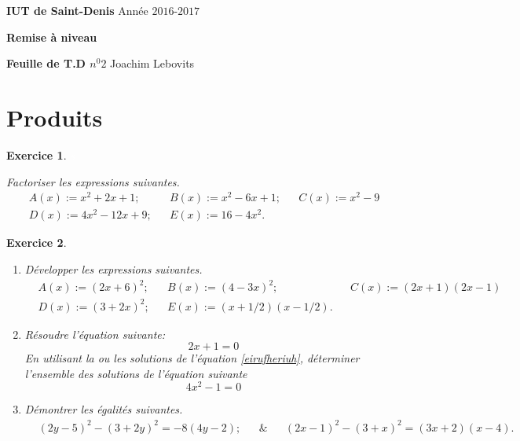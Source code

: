 \documentclass [10pt,a4paper] {article}
\newtheorem{exo}{Exercice}
\renewcommand\theequation{\thesection.\arabic{equation}}
\begin{document}
\setlength{\parindent}{0em}
\makeatletter
\renewcommand\theequation{\thesection.\arabic{equation}}
\makeatother


\begin{flushleft}
{ \bfseries IUT de Saint-Denis}			\hspace{9.25cm}				Année $2016$-$2017$

{ \bfseries Remise à niveau	}					

{ \bfseries Feuille de T.D $n^{0}2$}		 \hspace{9.5cm} Joachim Lebovits
\end{flushleft}




\date\today




\vspace{1cm}


\section{Produits}

\begin{exo}%

\textcolor{white}{s}

Factoriser les expressions suivantes.
\begin{align*}
 &A(x):= x^{2}+2x+1;&  &B(x):=x^{2}-6x+1;& 
 &C(x):=x^{2}-9&\\
&D(x):= 4x^{2}-12x+9;& &E(x):= 16-4x^{2}.&
\end{align*}
\end{exo}


\begin{exo}%


\begin{enumerate}
\item Développer les expressions suivantes.
\begin{align*}
 &A(x):= (2x+6)^{2};&  &B(x):= (4-3x)^{2};& 
 &C(x):=(2x+1)(2x-1)&\\
&D(x):= (3+2x)^{2};& &E(x):= (x+1/2)(x-1/2).&
\end{align*}
\item Résoudre l'équation suivante:
\begin{equation}
 \label{eirufheriuh}
 2x+1=0
\end{equation}
En utilisant la ou les solutions de l'équation \eqref{eirufheriuh}, déterminer l'ensemble des solutions de l'équation suivante
\begin{equation*}
 4x^{2}-1=0
\end{equation*}
 
\item Démontrer les égalités suivantes.
\begin{align*}
&(2y-5)^{2}-(3+2y)^{2}=-8(4y-2);& 
&\&& 
&(2x-1)^{2}-(3+x)^{2}=(3x+2)(x-4).&
 \end{align*}
\end{enumerate}

\end{exo}
\vspace{0.25cm}
\end{document}
